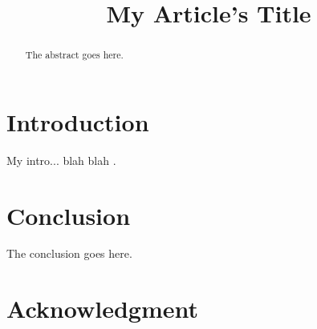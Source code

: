 \documentclass[conference]{IEEEtran}
\begin{document}
    
    
    \title{My Article's Title}

    \author{\IEEEauthorblockN{****}
    \and
    \IEEEauthorblockN{****}
    }
    \maketitle


    \begin{abstract}
    The abstract goes here.
    \end{abstract}
    \IEEEpeerreviewmaketitle

    \section{Introduction}
    My intro... blah blah \cite{jj2}.

    \section{Conclusion}
    The conclusion goes here.

    \section*{Acknowledgment}

    
\end{document}
